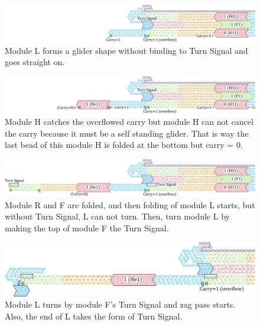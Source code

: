 \documentclass[runningheads]{llncs}
\begin{document}
\begin{figure}[tb]
\centering
\includegraphics[width=\linewidth]{fig/svg/CounterEx14_1.pdf}
\caption{
Module L forms a glider shape without binding to Turn Signal and goes straight on. 
}
\label{fig:overflowex2}
\end{figure}

\begin{figure}[tb]
\centering
\includegraphics[width=\linewidth]{fig/svg/CounterEx15_1.pdf}
\caption{
Module H catches the overflowed carry but module H can not cancel the carry because it must be a self standing glider.
That is way the last bead of this module H is folded at the bottom but carry = 0. 
}
\label{fig:overflowex3}
\end{figure}


\begin{figure}[tb]
\centering
\includegraphics[width=\linewidth]{fig/svg/CounterEx17_1.pdf}
\caption{
Module R and F are folded, and then folding of module L starts, but without Turn Signal, L can not turn.
Then, turn module L by making the top of module F the Turn Signal.
}
\label{fig:overflowex4}
\end{figure}

\begin{figure}[tb]
\centering
\includegraphics[width=\linewidth]{fig/svg/CounterEx18_1.pdf}
\caption{
Module L turns by module F's Turn Signal and zag pass starts.
Also, the end of L takes the form of Turn Signal.
}
\label{fig:overflowex5}
\end{figure}
\end{document}
